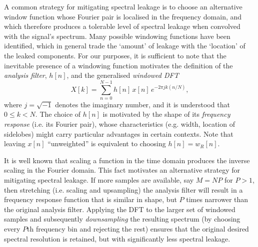 \documentclass{pasa}%
\begin{document}
A common strategy for mitigating spectral leakage is to choose an alternative window function whose Fourier pair is localised in the frequency domain, and which therefore produces a tolerable level of spectral leakage when convolved with the signal's spectrum.
Many possible windowing functions have been identified, which in general trade the `amount' of leakage with the `location' of the leaked components.
For our purposes, it is sufficient to note that the inevitable presence of a windowing function motivates the definition of the \textit{analysis filter}, $h[n]$, and the generalised \textit{windowed DFT}
\begin{equation}
    X[k] = \sum_{n=0}^{N-1} h[n]\,x[n]\,e^{-2\pi j k (n/N)},
    \label{eqn:wdft}
\end{equation}
where $j = \sqrt{-1}$ denotes the imaginary number, and it is understood that $0 \le k < N$.
The choice of $h[n]$ is motivated by the shape of its \textit{frequency response} (i.e. its Fourier pair), whose characteristics (e.g. width, location of sidelobes) might carry particular advantages in certain contexts.
Note that leaving $x[n]$ ``unweighted'' is equivalent to choosing $h[n] = w_R[n]$.

It is well known that scaling a function in the time domain produces the inverse scaling in the Fourier domain.
This fact motivates an alternative strategy for mitigating spectral leakage.
If more samples are available, say $M = NP$ for $P > 1$, then stretching (i.e. scaling and upsampling) the analysis filter will result in a frequency response function that is similar in shape, but $P$ times narrower than the original analysis filter.
Applying the DFT to the larger set of windowed samples and subsequently \emph{downsampling} the resulting spectrum (by choosing every $P$th frequency bin and rejecting the rest) ensures that the original desired spectral resolution is retained, but with significantly less spectral leakage.
\end{document}
